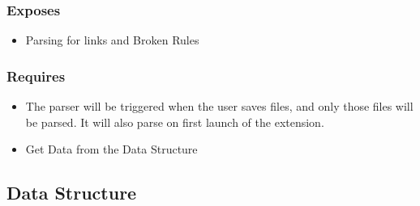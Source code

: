 \documentclass[letterpaper,10pt,titlepage,draftclsnofoot,onecolumn,onesided] {IEEEtran}
\begin{document}
		\subsubsection{Exposes}
			\begin{itemize}
			\item Parsing for links and Broken Rules
			\end{itemize}
		\subsubsection{Requires}
			\begin{itemize}
			\item The parser will be triggered when the user saves files, and only those files will be parsed. 
			It will also parse on first launch of the extension.
			\item Get Data from the Data Structure
			\end{itemize}
	
	\subsection{Data Structure}
\end{document}
